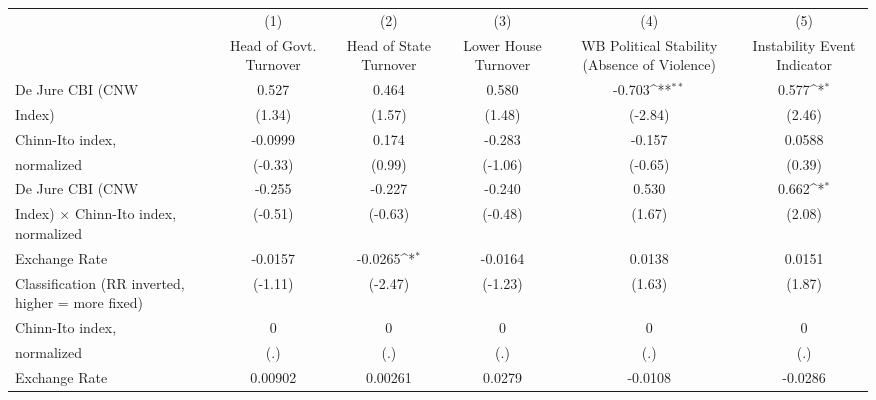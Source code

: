 {
\def\sym#1{\ifmmode^{#1}\else\(^{#1}\)\fi}
\begin{tabular}{l*{5}{c}}
\hline\hline
                    &\multicolumn{1}{c}{(1)}&\multicolumn{1}{c}{(2)}&\multicolumn{1}{c}{(3)}&\multicolumn{1}{c}{(4)}&\multicolumn{1}{c}{(5)}\\
                    &\multicolumn{1}{c}{Head of Govt. Turnover}&\multicolumn{1}{c}{Head of State Turnover}&\multicolumn{1}{c}{Lower House Turnover}&\multicolumn{1}{c}{WB Political Stability (Absence of Violence)}&\multicolumn{1}{c}{Instability Event Indicator}\\
\hline
De Jure CBI (CNW    &       0.527         &       0.464         &       0.580         &      -0.703\sym{**} &       0.577\sym{*}  \\
Index)              &      (1.34)         &      (1.57)         &      (1.48)         &     (-2.84)         &      (2.46)         \\
[1em]
Chinn-Ito index,    &     -0.0999         &       0.174         &      -0.283         &      -0.157         &      0.0588         \\
normalized          &     (-0.33)         &      (0.99)         &     (-1.06)         &     (-0.65)         &      (0.39)         \\
[1em]
De Jure CBI (CNW    &      -0.255         &      -0.227         &      -0.240         &       0.530         &       0.662\sym{*}  \\
Index) $\times$ Chinn-Ito index, normalized&     (-0.51)         &     (-0.63)         &     (-0.48)         &      (1.67)         &      (2.08)         \\
[1em]
Exchange Rate       &     -0.0157         &     -0.0265\sym{*}  &     -0.0164         &      0.0138         &      0.0151         \\
Classification (RR inverted, higher = more fixed)&     (-1.11)         &     (-2.47)         &     (-1.23)         &      (1.63)         &      (1.87)         \\
[1em]
Chinn-Ito index,    &           0         &           0         &           0         &           0         &           0         \\
normalized          &         (.)         &         (.)         &         (.)         &         (.)         &         (.)         \\
[1em]
Exchange Rate       &     0.00902         &     0.00261         &      0.0279         &     -0.0108         &     -0.0286         \\

\end{tabular}}
